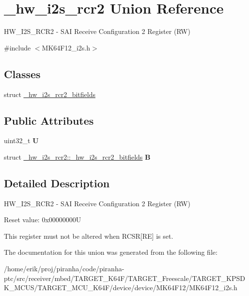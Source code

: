 \hypertarget{union__hw__i2s__rcr2}{}\section{\+\_\+hw\+\_\+i2s\+\_\+rcr2 Union Reference}
\label{union__hw__i2s__rcr2}


H\+W\+\_\+\+I2\+S\+\_\+\+R\+C\+R2 -\/ S\+AI Receive Configuration 2 Register (RW)  




{\ttfamily \#include $<$M\+K64\+F12\+\_\+i2s.\+h$>$}

\subsection*{Classes}
\begin{DoxyCompactItemize}
\item 
struct \hyperlink{struct__hw__i2s__rcr2_1_1__hw__i2s__rcr2__bitfields}{\+\_\+hw\+\_\+i2s\+\_\+rcr2\+\_\+bitfields}
\end{DoxyCompactItemize}
\subsection*{Public Attributes}
\begin{DoxyCompactItemize}
\item 
uint32\+\_\+t {\bfseries U}\hypertarget{union__hw__i2s__rcr2_aeffddc11d79674e73e1149ca0f025cc8}{}\label{union__hw__i2s__rcr2_aeffddc11d79674e73e1149ca0f025cc8}

\item 
struct \hyperlink{struct__hw__i2s__rcr2_1_1__hw__i2s__rcr2__bitfields}{\+\_\+hw\+\_\+i2s\+\_\+rcr2\+::\+\_\+hw\+\_\+i2s\+\_\+rcr2\+\_\+bitfields} {\bfseries B}\hypertarget{union__hw__i2s__rcr2_a4eb3b4d0c84bfcf8b5c53d0b7f8dcf02}{}\label{union__hw__i2s__rcr2_a4eb3b4d0c84bfcf8b5c53d0b7f8dcf02}

\end{DoxyCompactItemize}


\subsection{Detailed Description}
H\+W\+\_\+\+I2\+S\+\_\+\+R\+C\+R2 -\/ S\+AI Receive Configuration 2 Register (RW) 

Reset value\+: 0x00000000U

This register must not be altered when R\+C\+SR\mbox{[}RE\mbox{]} is set. 

The documentation for this union was generated from the following file\+:\begin{DoxyCompactItemize}
\item 
/home/erik/proj/piranha/code/piranha-\/ptc/src/receiver/mbed/\+T\+A\+R\+G\+E\+T\+\_\+\+K64\+F/\+T\+A\+R\+G\+E\+T\+\_\+\+Freescale/\+T\+A\+R\+G\+E\+T\+\_\+\+K\+P\+S\+D\+K\+\_\+\+M\+C\+U\+S/\+T\+A\+R\+G\+E\+T\+\_\+\+M\+C\+U\+\_\+\+K64\+F/device/device/\+M\+K64\+F12/M\+K64\+F12\+\_\+i2s.\+h\end{DoxyCompactItemize}
